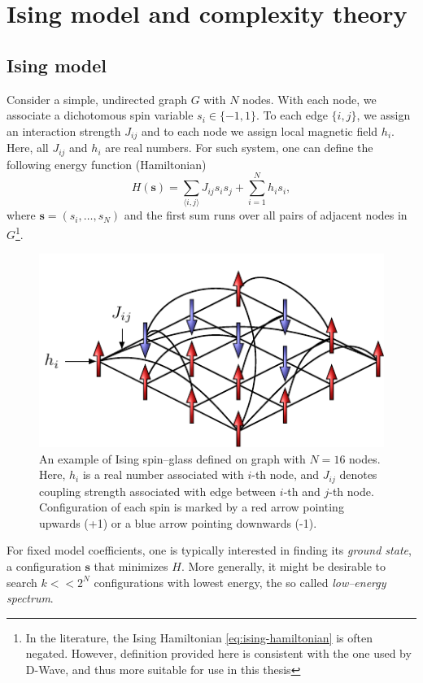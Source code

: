 \chapter{Ising model and complexity theory}

\section{Ising model}
Consider a simple, undirected graph $G$ with $N$ nodes. With each node, we associate a dichotomous spin variable $s_i \in \{-1, 1\}$. To each edge $\{i, j\}$, we assign an interaction strength $J_{ij}$ and to each node we assign local magnetic field $h_i$. Here, all $J_{ij}$ and $h_i$ are real numbers. For such system, one can define the following energy function (Hamiltonian)
\begin{equation}
\label{eq:ising-hamiltonian}
H(\mathbf{s}) = \sum_{\langle i, j \rangle} J_{ij} s_i s_j +  \sum_{i=1}^N h_i s_i,
\end{equation}
where $\mathbf{s} = (s_i, \ldots, s_N)$ and the first sum runs over all pairs of adjacent nodes in $G$\footnote{In the literature, the Ising Hamiltonian \eqref{eq:ising-hamiltonian} is often negated. However, definition provided here is consistent with the one used by D-Wave, and thus more suitable for use in this thesis}.
\begin{figure}
    \centering
    \includegraphics{figures/spins.pdf}
    \caption{An example of Ising  spin--glass defined on graph with $N=16$ nodes. Here, $h_i$ is a real number associated with $i$-th node, and $J_{ij}$ denotes coupling strength associated with edge between $i$-th and $j$-th node. Configuration of each spin is marked by a red arrow pointing upwards (+1) or a blue arrow pointing downwards (-1).}
    \label{fig:my_label}
\end{figure}
For fixed model coefficients, one is typically interested in finding its \emph{ground state}, a configuration $\mathbf{s}$ that minimizes $H$. More generally, it might be desirable to search $k << 2^N$ configurations with lowest energy, the so called \emph{low--energy spectrum}. 

